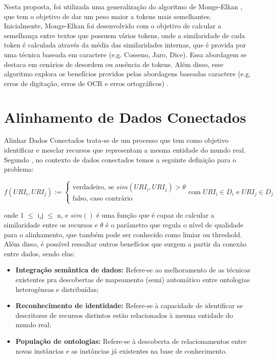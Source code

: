 Nesta proposta, foi utilizada uma generalização do algoritmo de Monge-Elkan \cite{monge1996field}, que tem o objetivo de dar um peso maior a tokens mais semelhantes. Inicialmente, Monge-Elkan foi desenvolvido com o objetivo de calcular a semelhança entre textos que possuem vários tokens, onde a similaridade de cada token é calculada através da média das similaridades internas, que é provida por uma técnica baseada em caractere (e.g. Cosseno, Jaro, Dice). Essa abordagem se destaca em cenários de desordem ou ausência de tokens. Além disso, esse algoritmo explora os benefícios providos pelas abordagens baseadas caractere (e.g. erros de digitação, erros de OCR e erros ortográficos) \cite{jimenez2009generalized}.

\section{Alinhamento de Dados Conectados}

Alinhar Dados Conectados  trata-se de um processo que tem como objetivo identificar e mesclar recursos que representam a mesma entidade do mundo real. Segundo , no contexto de dados conectados temos a seguinte definição para o problema:

\begin{equation}
f\left( { URI }_{ i },{ URI }_{ j } \right) :=\begin{cases} \mbox{verdadeiro, se } sim\left( { URI }_{ i },{ URI }_{ j } \right) >\theta  \\ \mbox{falso, caso contrário} \end{cases}\mbox{com }{ URI }_{ i } \in { D }_{ i }\mbox{ e }{ URI }_{ j } \in { D }_{ j }
\end{equation}

onde 1 $\leq$ i,j $\leq$ n, e $sim()$ é uma função que é capaz de calcular a similaridade entre os recursos e $\theta$ é o parâmetro que regula o nível de qualidade para o alinhamento, que também pode ser conhecido como limiar ou threshold. Além disso, é possível ressaltar outros benefícios que surgem a partir da conexão entre dados, sendo elas: 

\begin{itemize}
	\item \textbf{Integração semântica de dados:} Refere-se ao melhoramento de as técnicas existentes pra descobertas de mapeamento (semi) automático entre ontologias heterogêneas e distribuídas; 
	\item \textbf{Reconhecimento de identidade:} Refere-se à capacidade de identificar se descritores de recursos distintos estão relacionados à mesma entidade do mundo real; 
	\item\textbf{ População de ontologias:} Refere-se à descoberta de relacionamentos entre novas instâncias e as instâncias já existentes na base de conhecimento. 
\end{itemize}


